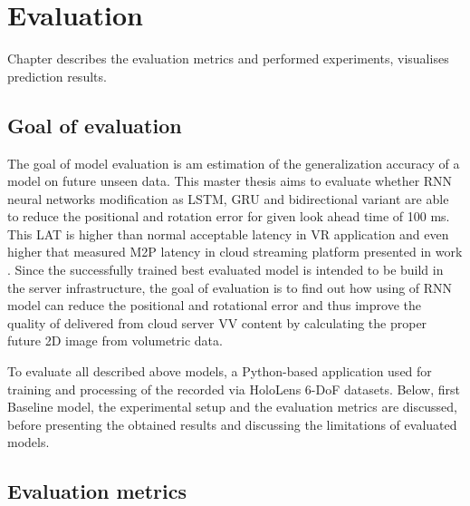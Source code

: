 
\chapter{Evaluation}
\label{sec:eval}
Chapter describes the evaluation metrics and performed experiments, visualises prediction results.

\section{Goal of evaluation}
\label{sec:eval:goal}
The goal of model evaluation is am estimation of the generalization accuracy of a model on future unseen data. This master thesis aims to evaluate whether RNN neural networks modification as LSTM, GRU and bidirectional variant are able to reduce the positional and rotation error for given look ahead time of 100 ms. This LAT is higher than normal acceptable latency in VR application and even higher that measured M2P latency in cloud streaming platform presented in work \cite{serhan_cloud_streaming}. Since the successfully trained best evaluated model is intended to be build in the server infrastructure, the goal of evaluation is to find out how using of RNN model can reduce the positional and rotational error and thus improve the quality of delivered from cloud server VV content by calculating the proper future 2D image from volumetric data.  

To evaluate all described above models, a Python-based application used for training and processing of the recorded via HoloLens 6-DoF datasets. Below, first Baseline model, the experimental setup and the evaluation metrics are discussed, before presenting the obtained results and discussing the limitations of evaluated models.

\section{Evaluation metrics}
\label{sec:eval:metrics}

